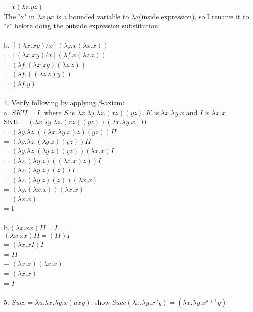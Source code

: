 \documentclass[12pt]{article}
\begin{document}
= $x(\lambda z.yz)$\\
The "x" in $\lambda x.yx$ is a bounded variable to $\lambda x$(inside expression), so I rename it to "z" before doing the outside expression substitution.\\
\vspace{1mm}\\
b. $[(\lambda x.xy)/x](\lambda y.x(\lambda x.x))$\\
= $[(\lambda x.xy)/x](\lambda f.x(\lambda z.z))$\\
= $(\lambda f.(\lambda x.xy)(\lambda z.z))$\\
= $(\lambda f.((\lambda z.z)y))$\\
= $(\lambda f.y)$\\
\vspace{1mm}\\
4. Verify following by applying $\beta$-axiom:\\
a. $SKII = I$, where $S$ is $\lambda x.\lambda y.\lambda z.(xz)(yz), K$ is $\lambda x.\lambda y.x$ and $I$ is $\lambda x.x$\\
SKII = $(\lambda x.\lambda y.\lambda z.(xz)(yz))(\lambda x.\lambda y.x)II$\\
= $(\lambda y.\lambda z.((\lambda x.\lambda y.x)z)(yz))II$\\
= $(\lambda y.\lambda z.(\lambda y.z)(yz))II$\\
= $(\lambda y.\lambda z.(\lambda y.z)(yz))(\lambda x.x)I$\\
= $(\lambda z.(\lambda y.z)((\lambda x.x)z))I$\\
= $(\lambda z.(\lambda y.z)(z))I$\\
= $(\lambda z.(\lambda y.z)(z))(\lambda x.x)$\\
= $(\lambda y.(\lambda x.x))(\lambda x.x)$\\
= $(\lambda x.x)$\\
= I\\
\vspace{1mm}\\
b.$(\lambda x.xx)II = I$\\
$(\lambda x.xx)II = (II)I$\\
= $(\lambda x.xI)I$\\
= $II$\\
= $(\lambda x.x)(\lambda x.x)$\\
= $(\lambda x.x)$\\
= $I$\\
\vspace{1mm}\\
5. $Succ = \lambda u.\lambda x.\lambda y.x(uxy)$, show $Succ(\lambda x.\lambda y.x^{n}y) = (\lambda x.\lambda y. x^{n+1}y)$\\
\end{document}
